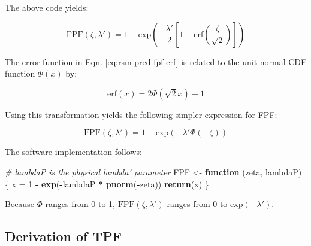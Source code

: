 \documentclass[
]{book}
\newenvironment{Shaded}{\begin{snugshade}}{\end{snugshade}}
\newcommand{\CommentTok}[1]{\textcolor[rgb]{0.56,0.35,0.01}{\textit{#1}}}
\newcommand{\ControlFlowTok}[1]{\textcolor[rgb]{0.13,0.29,0.53}{\textbf{#1}}}
\newcommand{\DecValTok}[1]{\textcolor[rgb]{0.00,0.00,0.81}{#1}}
\newcommand{\KeywordTok}[1]{\textcolor[rgb]{0.13,0.29,0.53}{\textbf{#1}}}
\newcommand{\NormalTok}[1]{#1}
\newcommand{\OperatorTok}[1]{\textcolor[rgb]{0.81,0.36,0.00}{\textbf{#1}}}
\newcommand{\StringTok}[1]{\textcolor[rgb]{0.31,0.60,0.02}{#1}}
\begin{document}
The above code yields:

\begin{equation}
\text{FPF}\left (\zeta , \lambda'\right ) = 1 - \text{exp}\left ( -\frac{\lambda'}{2} \left [ 1-\text{erf}\left ( \frac{\zeta}{\sqrt{2}} \right ) \right ]  \right ) 
\label{eq:rsm-pred-fpf-erf}
\end{equation}

The error function in Eqn. \eqref{eq:rsm-pred-fpf-erf} is related to the unit normal CDF function \(\Phi(x)\) by:

\begin{equation}
\text{erf} \left (x \right ) =  2\Phi \left ( \sqrt{2} x\right ) - 1
\label{eq:rsm-pred-erf-phi-relation}
\end{equation}

Using this transformation yields the following simpler expression for FPF:

\begin{equation}
\text{FPF}\left (\zeta , \lambda'\right ) = 1 - \text{exp}\left ( -\lambda' \Phi\left ( -\zeta \right )  \right ) 
\label{eq:rsm-pred-fpf}
\end{equation}

The software implementation follows:

\begin{Shaded}
\begin{Highlighting}[]
\CommentTok{# lambdaP is the physical lambda' parameter}
\NormalTok{FPF <-}\StringTok{ }\ControlFlowTok{function}\NormalTok{ (zeta, lambdaP) \{}
\NormalTok{  x =}\StringTok{ }\DecValTok{1} \OperatorTok{-}\StringTok{ }\KeywordTok{exp}\NormalTok{(}\OperatorTok{-}\NormalTok{lambdaP }\OperatorTok{*}\StringTok{ }\KeywordTok{pnorm}\NormalTok{(}\OperatorTok{-}\NormalTok{zeta))}
  \KeywordTok{return}\NormalTok{(x)}
\NormalTok{\}}
\end{Highlighting}
\end{Shaded}

Because \(\Phi\) ranges from 0 to 1, \(\text{FPF}\left (\zeta , \lambda'\right )\) ranges from 0 to \(\text{exp} \left ( -\lambda' \right )\).

\hypertarget{rsm-pred-roc-curve-tpf}{%
\subsection{Derivation of TPF}\label{rsm-pred-roc-curve-tpf}}
\end{document}
